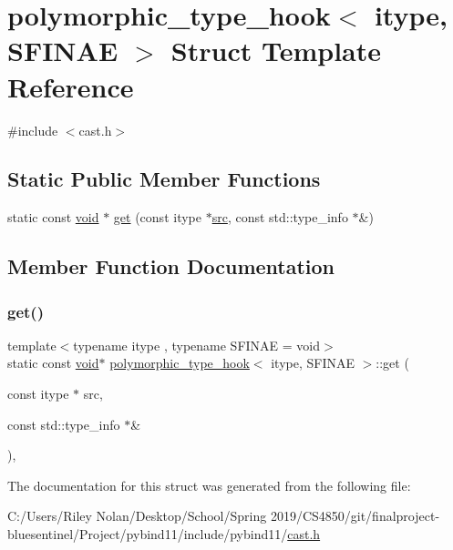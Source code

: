 \hypertarget{structpolymorphic__type__hook}{}\section{polymorphic\+\_\+type\+\_\+hook$<$ itype, S\+F\+I\+N\+AE $>$ Struct Template Reference}
\label{structpolymorphic__type__hook}


{\ttfamily \#include $<$cast.\+h$>$}

\subsection*{Static Public Member Functions}
\begin{DoxyCompactItemize}
\item 
static const \mbox{\hyperlink{_s_d_l__opengles2__gl2ext_8h_ae5d8fa23ad07c48bb609509eae494c95}{void}} $\ast$ \mbox{\hyperlink{structpolymorphic__type__hook_a1e4a6727e995692b859caa150ee55290}{get}} (const itype $\ast$\mbox{\hyperlink{_s_d_l__opengl__glext_8h_a72e0fdf0f845ded60b1fada9e9195cd7}{src}}, const std\+::type\+\_\+info $\ast$\&)
\end{DoxyCompactItemize}


\subsection{Member Function Documentation}
\mbox{\label{structpolymorphic__type__hook_a1e4a6727e995692b859caa150ee55290}} 
\subsubsection{\texorpdfstring{get()}{get()}}
{\footnotesize\ttfamily template$<$typename itype , typename S\+F\+I\+N\+AE  = void$>$ \\
static const \mbox{\hyperlink{_s_d_l__opengles2__gl2ext_8h_ae5d8fa23ad07c48bb609509eae494c95}{void}}$\ast$ \mbox{\hyperlink{structpolymorphic__type__hook}{polymorphic\+\_\+type\+\_\+hook}}$<$ itype, S\+F\+I\+N\+AE $>$\+::get (\begin{DoxyParamCaption}\item[{const itype $\ast$}]{src,  }\item[{const std\+::type\+\_\+info $\ast$\&}]{ }\end{DoxyParamCaption})\hspace{0.3cm}{\ttfamily [inline]}, {\ttfamily [static]}}



The documentation for this struct was generated from the following file\+:\begin{DoxyCompactItemize}
\item 
C\+:/\+Users/\+Riley Nolan/\+Desktop/\+School/\+Spring 2019/\+C\+S4850/git/finalproject-\/bluesentinel/\+Project/pybind11/include/pybind11/\mbox{\hyperlink{cast_8h}{cast.\+h}}\end{DoxyCompactItemize}
